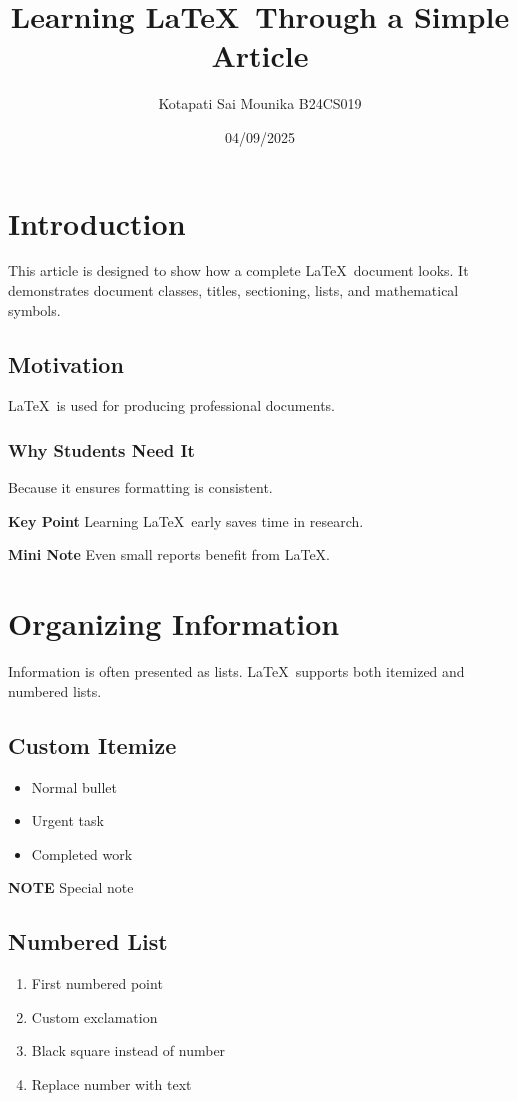 \documentclass{article}
\title{Learning \LaTeX\ Through a Simple Article}
\author{Kotapati Sai Mounika B24CS019}
\date{04/09/2025}
\begin{document}
	\maketitle
	
	\section{Introduction}
	This article is designed to show how a complete \LaTeX\ document looks. It
	demonstrates document classes, titles, sectioning, lists, and mathematical
	symbols.
	
	\subsection{Motivation}
	\LaTeX\ is used for producing professional documents.
	
	\subsubsection{Why Students Need It}
	Because it ensures formatting is consistent.
	
	\textbf{Key Point} Learning \LaTeX\ early saves time in research.
	
	\textbf{Mini Note} Even small reports benefit from \LaTeX.
	
	\section{Organizing Information}
	Information is often presented as lists. \LaTeX\ supports both itemized and
	numbered lists.
	
	\subsection{Custom Itemize}
	\begin{itemize}[label=$\bullet$]
		\item Normal bullet
		\item[\!] Urgent task
		\item[$\blacksquare$] Completed work
	\end{itemize}
	
	\textbf{NOTE} Special note
	
	\subsection{Numbered List}
	\begin{enumerate}
		\item First numbered point
		\item[\!] Custom exclamation
		\item[$\blacksquare$] Black square instead of number
		\item[NOTE] Replace number with text
	\end{enumerate}
	
\end{document}
